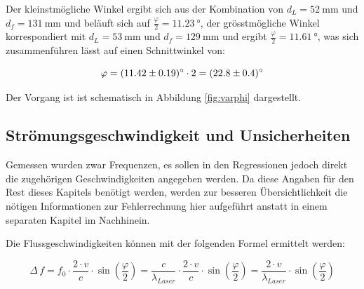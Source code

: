 Der kleinstm\"ogliche Winkel ergibt sich aus der Kombination von
$d_L = \SI{52}{\milli\meter}$
und
$d_f = \SI{131}{\milli\meter}$
und
bel\"auft sich auf
$\frac{\varphi}{2} = \SI{11.23}{\degree}$,
der gr\"osstm\"ogliche Winkel korrespondiert mit
$d_L = \SI{53}{\milli\meter}$
und
$d_f = \SI{129}{\milli\meter}$
und ergibt
$\frac{\varphi}{2} = \SI{11.61}{\degree}$,
was sich zusammenf\"uhren l\"asst auf einen Schnittwinkel von:

\begin{equation}
    \label{eq:varphi_result}
    \varphi = \SI{11.42 \pm 0.19}{\degree} \cdot 2 = \SI{22.8 \pm 0.4}{\degree}
\end{equation}

Der Vorgang ist ist schematisch in Abbildung \ref{fig:varphi} dargestellt.

\begin{minipage}[t]{\textwidth}
    \centering
    \resizebox{.67\textwidth}{!}{}
    \label{fig:varphi}
\end{minipage}



\clearpage
\subsection{Str\"omungsgeschwindigkeit und Unsicherheiten}
\label{subsec:vUncert}


Gemessen  wurden  zwar  Frequenzen,  es  sollen  in  den  Regressionen  jedoch
direkt die zugeh\"origen Geschwindigkeiten  angegeben werden. Da diese Angaben
f\"ur  den  Rest  dieses  Kapitels  ben\"otigt  werden,  werden  zur  besseren
\"Ubersichtlichkeit  die  n\"otigen   Informationen  zur  Fehlerrechnung  hier
aufgef\"uhrt anstatt in einem separaten Kapitel im Nachhinein.

Die Flussgeschwindigkeiten k\"onnen mit der folgenden Formel ermittelt werden:

\begin{equation}
        \label{eq:deltaF2}
        \Delta\,f = f_0 \cdot \frac{2 \cdot v}{c} \cdot \sin\left( \frac{\varphi}{2}\right)
                  = \frac{c}{\lambda_{Laser}} \cdot \frac{2 \cdot v}{c} \cdot \sin\left( \frac{\varphi}{2}\right)
                  = \frac{2 \cdot v}{\lambda_{Laser}} \cdot \sin\left( \frac{\varphi}{2}\right)
\end{equation}

